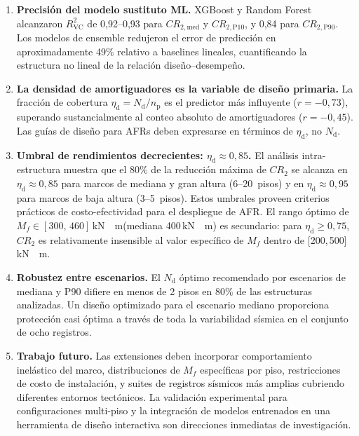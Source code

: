 \documentclass[preprint,12pt,authoryear]{elsarticle}
\newcommand{\CR}[1]{CR_{2,\text{#1}}}
\newcommand{\Rsq}{R^{2}_{\mathrm{VC}}}
\newcommand{\nd}{N_{\mathrm{d}}}
\newcommand{\np}{n_{\mathrm{p}}}
\newcommand{\etad}{\eta_{\mathrm{d}}}
\newcommand{\Mf}{M_{\!f}}
\newcommand{\KM}{\,\si{kN{\cdot}m}}
\begin{document}
\begin{enumerate}

\item \textbf{Precisión del modelo sustituto ML.}
XGBoost y Random Forest alcanzaron $\Rsq$ de 0{,}92--0{,}93 para $\CR{med}$ y $\CR{P10}$, 
y 0{,}84 para $\CR{P90}$. Los modelos de ensemble redujeron el error de predicción en 
aproximadamente 49\% relativo a baselines lineales, cuantificando la estructura no lineal 
de la relación diseño--desempeño.

\item \textbf{La densidad de amortiguadores es la variable de diseño primaria.}
La fracción de cobertura $\etad = \nd/\np$ es el predictor más influyente ($r = -0{,}73$), 
superando sustancialmente al conteo absoluto de amortiguadores ($r = -0{,}45$). Las guías 
de diseño para AFRs deben expresarse en términos de $\etad$, no $\nd$.

\item \textbf{Umbral de rendimientos decrecientes: $\etad \approx 0{,}85$.}
El análisis intra-estructura muestra que el 80\% de la reducción máxima de $CR_2$ se alcanza
en $\etad \approx 0{,}85$ para marcos de mediana y gran altura (6--20~pisos) y en
$\etad \approx 0{,}95$ para marcos de baja altura (3--5~pisos). Estos umbrales proveen
criterios prácticos de costo-efectividad para el despliegue de AFR. El rango óptimo de
$\Mf \in [300,\,460]$\KM (mediana 400\KM) es secundario: para $\etad \geq 0{,}75$,
$CR_2$ es relativamente insensible al valor específico de $\Mf$ dentro de [200,\,500]\KM.

\item \textbf{Robustez entre escenarios.}
El $\nd$ óptimo recomendado por escenarios de mediana y P90 difiere en menos de 2 pisos en 
80\% de las estructuras analizadas. Un diseño optimizado para el escenario mediano proporciona 
protección casi óptima a través de toda la variabilidad sísmica en el conjunto de ocho registros.

\item \textbf{Trabajo futuro.}
Las extensiones deben incorporar comportamiento inelástico del marco, distribuciones de $\Mf$ 
específicas por piso, restricciones de costo de instalación, y suites de registros sísmicos 
más amplias cubriendo diferentes entornos tectónicos. La validación experimental para 
configuraciones multi-piso y la integración de modelos entrenados en una herramienta de diseño 
interactiva son direcciones inmediatas de investigación.

\end{enumerate}
\end{document}
